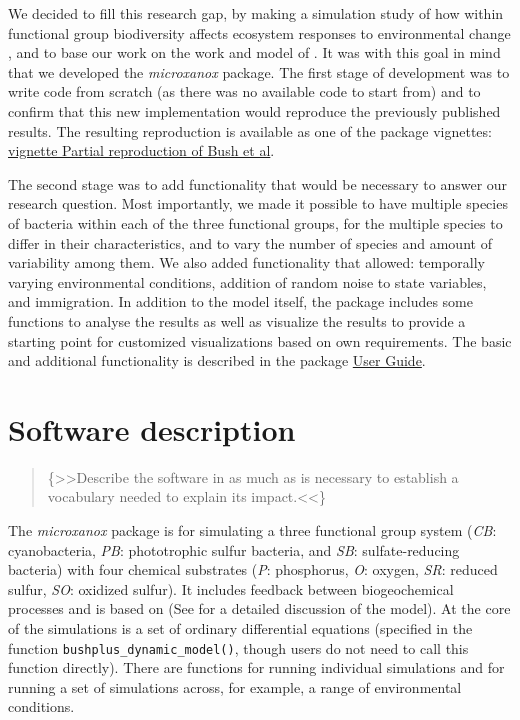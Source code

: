 \documentclass[]{elsarticle} %
\begin{document}
We decided to fill this research gap, by making a simulation study of
how within functional group biodiversity affects ecosystem responses to
environmental change \citet{Limberger2022}, and to base our work on the
work and model of \citet{Bush2017}. It was with this goal in mind that
we developed the \emph{microxanox} package. The first stage of
development was to write code from scratch (as there was no available
code to start from) and to confirm that this new implementation would
reproduce the previously published results. The resulting reproduction
is available as one of the package vignettes:
\href{LINK\%20NEEDED}{vignette Partial reproduction of Bush et al}.

The second stage was to add functionality that would be necessary to
answer our research question. Most importantly, we made it possible to
have multiple species of bacteria within each of the three functional
groups, for the multiple species to differ in their characteristics, and
to vary the number of species and amount of variability among them. We
also added functionality that allowed: temporally varying environmental
conditions, addition of random noise to state variables, and
immigration. In addition to the model itself, the package includes some
functions to analyse the results as well as visualize the results to
provide a starting point for customized visualizations based on own
requirements. The basic and additional functionality is described in the
package \href{LINK_NEEDED}{User Guide}.

\hypertarget{software-description}{%
\section{Software description}\label{software-description}}

\begin{quote}
\{\textgreater\textgreater Describe the software in as much as is
necessary to establish a vocabulary needed to explain its
impact.\textless\textless\}
\end{quote}

The \emph{microxanox} package is for simulating a three functional group
system (\emph{CB}: cyanobacteria, \emph{PB}: phototrophic sulfur
bacteria, and \emph{SB}: sulfate-reducing bacteria) with four chemical
substrates (\emph{P}: phosphorus, \emph{O}: oxygen, \emph{SR}: reduced
sulfur, \emph{SO}: oxidized sulfur). It includes feedback between
biogeochemical processes and is based on \citet{Bush2017} (See
\citet{Bush2017} for a detailed discussion of the model). At the core of
the simulations is a set of ordinary differential equations (specified
in the function \texttt{bushplus\_dynamic\_model()}, though users do not
need to call this function directly). There are functions for running
individual simulations and for running a set of simulations across, for
example, a range of environmental conditions.
\end{document}
